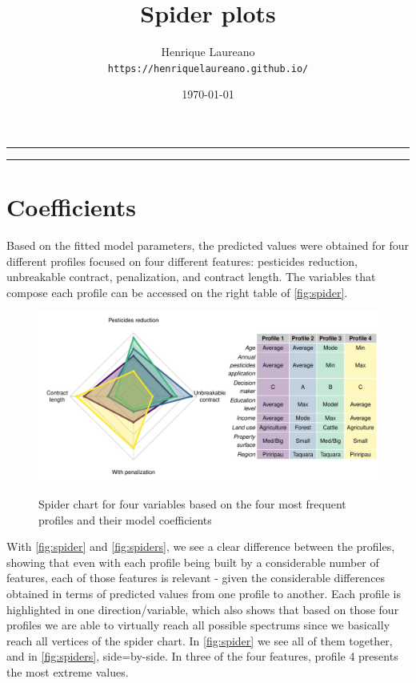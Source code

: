 \documentclass[12pt]{article}
\title{Spider plots}
\date{\today}
\author{Henrique Laureano\\
        \texttt{https://henriquelaureano.github.io/}}
\newcommand{\horrule}[1]{\rule{\linewidth}{#1}}
\begin{document}
\maketitle
\thispagestyle{empty}

\vfill
\noindent \horrule{.5pt} \vspace{-.95cm} \tableofcontents \noindent \horrule{.5pt}

\section*{Coefficients}

Based on the fitted model parameters, the predicted values were obtained
for four different profiles focused on four different features:
pesticides reduction, unbreakable contract, penalization, and contract
length. The variables that compose each profile can be accessed on the
right table of \autoref{fig:spider}.

\begin{figure}[H]
 \centering
 \includegraphics[width=\textwidth]{figures/spider.pdf}\\
 \caption{Spider chart for four variables based on the four most
          frequent profiles and their model coefficients}
 \label{fig:spider}
\end{figure}

With \autoref{fig:spider} and \autoref{fig:spiders}, we see a clear
difference between the profiles, showing that even with each profile
being built by a considerable number of features, each of those features
is relevant - given the considerable differences obtained in terms of
predicted values from one profile to another. Each profile is
highlighted in one direction/variable, which also shows that based on
those four profiles we are able to virtually reach all possible
spectrums since we basically reach all vertices of the spider chart. In
\autoref{fig:spider} we see all of them together, and in
\autoref{fig:spiders}, side=by-side. In three of the four features,
profile 4 presents the most extreme values.
\end{document}
